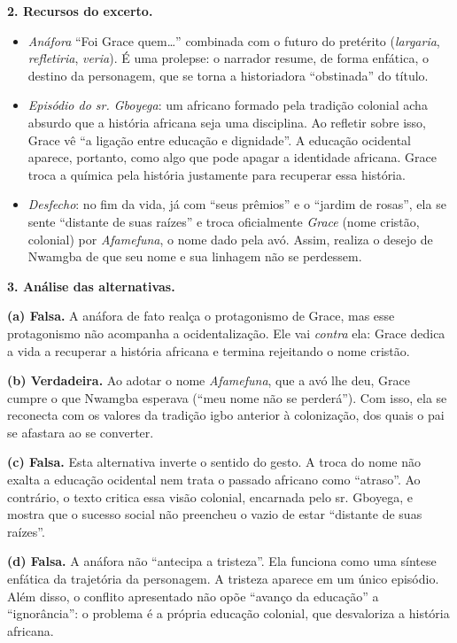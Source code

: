 \documentclass{article}%
\begin{document}
\textbf{2. Recursos do excerto.}
\begin{itemize}
\item \emph{Anáfora} ``Foi Grace quem\ldots'' combinada com o futuro do pretérito (\emph{largaria}, \emph{refletiria}, \emph{veria}). É uma prolepse: o narrador resume, de forma enfática, o destino da personagem, que se torna a historiadora ``obstinada'' do título.
\item \emph{Episódio do sr. Gboyega}: um africano formado pela tradição colonial acha absurdo que a história africana seja uma disciplina. Ao refletir sobre isso, Grace vê ``a ligação entre educação e dignidade''. A educação ocidental aparece, portanto, como algo que pode apagar a identidade africana. Grace troca a química pela história justamente para recuperar essa história.
\item \emph{Desfecho}: no fim da vida, já com ``seus prêmios'' e o ``jardim de rosas'', ela se sente ``distante de suas raízes'' e troca oficialmente \emph{Grace} (nome cristão, colonial) por \emph{Afamefuna}, o nome dado pela avó. Assim, realiza o desejo de Nwamgba de que seu nome e sua linhagem não se perdessem.
\end{itemize}

\textbf{3. Análise das alternativas.}

\textbf{(a) Falsa.} A anáfora de fato realça o protagonismo de Grace, mas esse protagonismo não acompanha a ocidentalização. Ele vai \emph{contra} ela: Grace dedica a vida a recuperar a história africana e termina rejeitando o nome cristão.

\textbf{(b) Verdadeira.} Ao adotar o nome \emph{Afamefuna}, que a avó lhe deu, Grace cumpre o que Nwamgba esperava (``meu nome não se perderá''). Com isso, ela se reconecta com os valores da tradição igbo anterior à colonização, dos quais o pai se afastara ao se converter.

\textbf{(c) Falsa.} Esta alternativa inverte o sentido do gesto. A troca do nome não exalta a educação ocidental nem trata o passado africano como ``atraso''. Ao contrário, o texto critica essa visão colonial, encarnada pelo sr. Gboyega, e mostra que o sucesso social não preencheu o vazio de estar ``distante de suas raízes''.

\textbf{(d) Falsa.} A anáfora não ``antecipa a tristeza''. Ela funciona como uma síntese enfática da trajetória da personagem. A tristeza aparece em um único episódio. Além disso, o conflito apresentado não opõe ``avanço da educação'' a ``ignorância'': o problema é a própria educação colonial, que desvaloriza a história africana.
\end{document}
